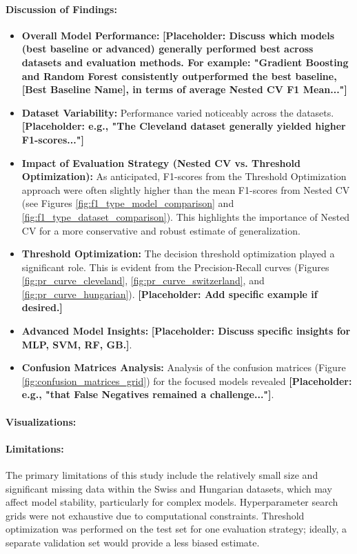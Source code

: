 \documentclass{article}
\begin{document}
\paragraph{Discussion of Findings:}
\begin{itemize}
    \item \textbf{Overall Model Performance:} \textbf{[Placeholder: Discuss which models (best baseline or advanced) generally performed best across datasets and evaluation methods. For example: "Gradient Boosting and Random Forest consistently outperformed the best baseline, [Best Baseline Name], in terms of average Nested CV F1 Mean..."]}
    \item \textbf{Dataset Variability:} Performance varied noticeably across the datasets. \textbf{[Placeholder: e.g., "The Cleveland dataset generally yielded higher F1-scores..."]}
    \item \textbf{Impact of Evaluation Strategy (Nested CV vs. Threshold Optimization):} As anticipated, F1-scores from the Threshold Optimization approach were often slightly higher than the mean F1-scores from Nested CV (see Figures \ref{fig:f1_type_model_comparison} and \ref{fig:f1_type_dataset_comparison}). This highlights the importance of Nested CV for a more conservative and robust estimate of generalization.
    \item \textbf{Threshold Optimization:} The decision threshold optimization played a significant role. This is evident from the Precision-Recall curves (Figures \ref{fig:pr_curve_cleveland}, \ref{fig:pr_curve_switzerland}, and \ref{fig:pr_curve_hungarian}). \textbf{[Placeholder: Add specific example if desired.]}
    \item \textbf{Advanced Model Insights:} \textbf{[Placeholder: Discuss specific insights for MLP, SVM, RF, GB.]}.
    \item \textbf{Confusion Matrices Analysis:} Analysis of the confusion matrices (Figure \ref{fig:confusion_matrices_grid}) for the focused models revealed \textbf{[Placeholder: e.g., "that False Negatives remained a challenge..."]}.
\end{itemize}

\paragraph{Visualizations:}


\paragraph{Limitations:}
The primary limitations of this study include the relatively small size and significant missing data within the Swiss and Hungarian datasets, which may affect model stability, particularly for complex models. Hyperparameter search grids were not exhaustive due to computational constraints. Threshold optimization was performed on the test set for one evaluation strategy; ideally, a separate validation set would provide a less biased estimate.
\end{document}
